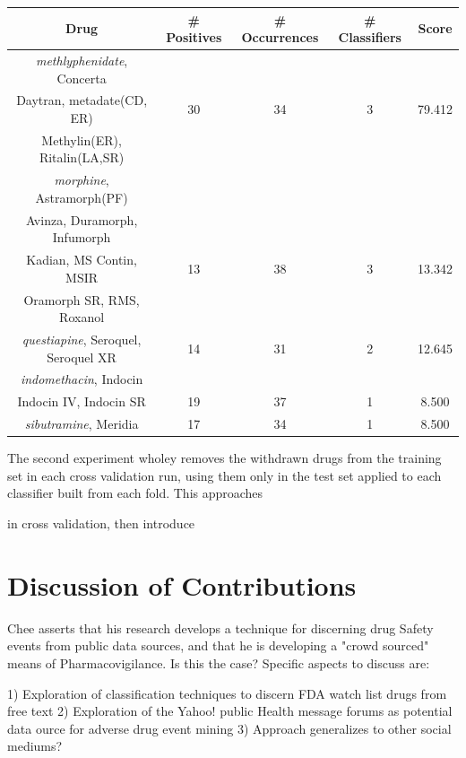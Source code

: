 \documentclass[twoside,11pt]{article}
\begin{document}
\begin{center}
  \begin{tabular}{||c c c c c||}
    \hline
    Drug & # Positives & # Occurrences & # Classifiers & Score \\
    \hline\hline
    \textit{methlyphenidate}, Concerta &   &   &  &  \\
    Daytran, metadate(CD, ER) & 30 & 34 & 3 & 79.412\\
    Methylin(ER), Ritalin(LA,SR) &  &  &  & \\
    \hline
    \textit{morphine}, Astramorph(PF) & & & & \\
    Avinza, Duramorph, Infumorph & & & &\\
    Kadian, MS Contin, MSIR & 13 & 38 & 3 & 13.342\\
    Oramorph SR, RMS, Roxanol & & & &\\
    \hline
    \textit{questiapine}, Seroquel, Seroquel XR & 14 & 31 & 2 & 12.645\\
    \hline
    \textit{indomethacin}, Indocin & & & & \\
    Indocin IV, Indocin SR & 19 & 37 & 1 & 8.500\\
    \hline
    \textit{sibutramine}, Meridia & 17 & 34 & 1 & 8.500\\
    \hline\hline


  \end{tabular}
\end{center}





The second experiment wholey removes the withdrawn drugs from the training set in each cross validation run, using them only in the test set applied to each classifier built from each fold. This approaches

 in cross validation, then introduce







\section{Discussion of Contributions}
Chee asserts that his research develops a technique for discerning drug Safety
events from public data sources, and that he is developing a "crowd sourced"
means of Pharmacovigilance.  Is this the case? Specific aspects to discuss are:

1) Exploration of classification techniques to discern FDA watch list drugs from
free text
2) Exploration of the Yahoo! public Health message forums as  potential
data ource for adverse drug event mining
3) Approach generalizes to other social mediums?
\end{document}
